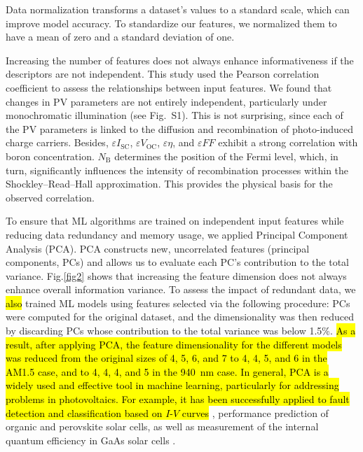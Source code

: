 \documentclass[a4paper,fleqn,draft]{cas-sc}
\begin{document}
Data normalization transforms a dataset's values to a standard scale, which can improve model accuracy.
To standardize our features, we normalized them to have a mean of zero and a standard deviation of one.

Increasing the number of features does not always enhance informativeness if the descriptors are not independent.
This study used the Pearson correlation coefficient to assess the relationships between input features.
We found that changes in PV parameters are not entirely independent, particularly under monochromatic illumination
(see Fig.~S1).
This is not surprising, since each of the PV parameters is linked to the diffusion and recombination of photo-induced charge carriers.
Besides,
$\varepsilon I_\mathrm{SC}$, $\varepsilon V_\mathrm{OC}$, $\varepsilon \eta$, and $\varepsilon F\!F$
exhibit a strong correlation with boron concentration.
$N_\mathrm{B}$ determines the position of the Fermi level, which, in turn, significantly influences
the intensity of recombination processes within the Shockley–Read–Hall approximation.
This provides the physical basis for the observed correlation.

To ensure that ML algorithms are trained on independent input features while reducing data redundancy and memory usage,
we applied Principal Component Analysis (PCA).
PCA constructs new, uncorrelated features (principal components, PCs) and allows us to evaluate each PC's contribution to the total variance.
Fig.\ref{fig2} shows that increasing the feature dimension does not always enhance overall information variance.
To assess the impact of redundant data, we 
\textcolor[rgb]{1.00,0.07,0.00}{
\hl{
also
}} 
trained ML models using features selected via the following procedure: 
PCs were computed for the original dataset, and the dimensionality was then reduced by discarding 
PCs whose contribution to the total variance was below 1.5\%.
\textcolor[rgb]{1.00,0.07,0.00}{
\hl{
As a result, after applying PCA, 
the feature dimensionality for the different models was reduced from the original sizes of 4, 5, 6, and 7 
to 4, 4, 5, and 6 in the AM1.5 case, and to 4, 4, 4, and 5 in the 940~nm case.
In general, PCA is a widely used and effective tool in machine learning,
particularly for addressing problems in photovoltaics.
For example, it has been successfully applied to fault detection and classification based on $I$-$V$ curves} \cite{Fadhel2019, Gao2020},
performance prediction of organic \cite{David2021} and perovskite \cite{Liu2022} solar cells,
as well as measurement of the internal quantum efficiency in GaAs solar cells \cite{AbdullahVetter2025}.
}
\end{document}
